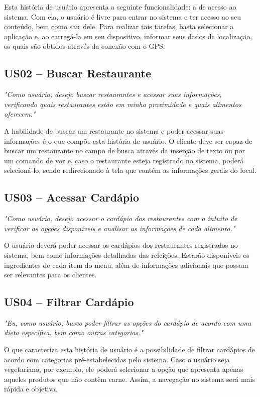 Esta história de usuário apresenta a seguinte funcionalidade: a de acesso ao sistema. Com ela, o usuário é livre para entrar no sistema e ter acesso ao seu conteúdo, bem como sair dele. Para realizar tais tarefas, basta selecionar a aplicação e, ao carregá-la em seu dispositivo, informar seus dados de localização, os quais são obtidos através da conexão com o GPS.

\subsection{US02 -- Buscar Restaurante}

\textit{"Como usuário, desejo buscar restaurantes e acessar suas informações,  verificando quais restaurantes estão em minha proximidade e quais alimentos oferecem."}

A habilidade de buscar um restaurante no sistema e poder acessar suas informações é o que compõe esta história de usuário. O cliente deve ser capaz de buscar um restaurante no campo de busca através da inserção de texto ou por um comando de voz e, caso o restaurante esteja registrado no sistema, poderá selecioná-lo, sendo redirecionado à tela que contém as informações gerais do local. 

\subsection{US03 -- Acessar Cardápio}

\textit{"Como usuário, desejo acessar o cardápio dos restaurantes com o intuito de verificar as opções disponíveis e analisar as informações de cada alimento."}

O usuário deverá poder acessar os cardápios dos restaurantes registrados no sistema, bem como informações detalhadas das refeições. Estarão disponíveis os ingredientes de cada item do menu, além de informações adicionais que possam ser relevantes para os clientes.

\subsection{US04 -- Filtrar Cardápio}

\textit{"Eu, como usuário, busco poder filtrar as opções do cardápio de acordo com uma dieta específica, bem como outras categorias."}

O que caracteriza esta história de usuário é a possibilidade de filtrar cardápios de acordo com categorias pré-estabelecidas pelo sistema. Caso o usuário seja vegetariano, por exemplo, ele poderá selecionar a opção que apresenta apenas aqueles produtos que não contêm carne. Assim, a navegação no sistema será mais rápida e objetiva.

